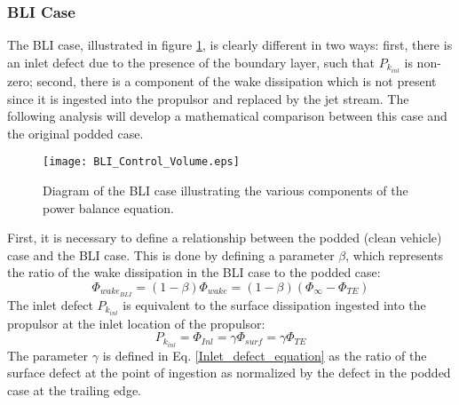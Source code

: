 				\subsubsection{\textbf{BLI Case}}
					The BLI case, illustrated in figure \ref{BLI_Control_Volume}, is clearly different in two ways:  first, there is an inlet defect due to the presence of the boundary layer, such that $P_{k_{inl}}$ is non-zero; second, there is a component of the wake dissipation which is not present since it is ingested into the propulsor and replaced by the jet stream.  The following analysis will develop a mathematical comparison between this case and the original podded case.
					\vspace{-5pt}
					\begin{figure}[htp]
						\centering
						\texttt{[image: BLI\_Control\_Volume.eps]}
						\caption{Diagram of the BLI case illustrating the various components of the power balance equation.}
						\label{BLI_Control_Volume}
					\end{figure}
					First, it is necessary to define a relationship between the podded (clean vehicle) case and the BLI case.  This is done by defining a parameter $\beta$, which represents the ratio of the wake dissipation in the BLI case to the podded case:
					\begin{equation}
						\Phi_{wake_{BLI}} = (1 - \beta)\Phi_{wake} = (1 - \beta) (\Phi_{\infty}-\Phi_{TE})
						\label{beta_definition}
					\end{equation}
					The inlet defect $P_{k_{inl}}$ is equivalent to the surface dissipation ingested into the propulsor at the inlet location of the propulsor:
					\begin{equation}
						P_{k_{inl}} = \Phi_{Inl} =  \gamma \Phi_{surf} = \gamma \Phi_{TE}
						\label{Inlet_defect_equation}
					\end{equation}
					The parameter $\gamma$ is defined in Eq. \ref{Inlet_defect_equation} as the ratio of the surface defect at the point of ingestion as normalized by the defect in the podded case at the trailing edge.  
					
